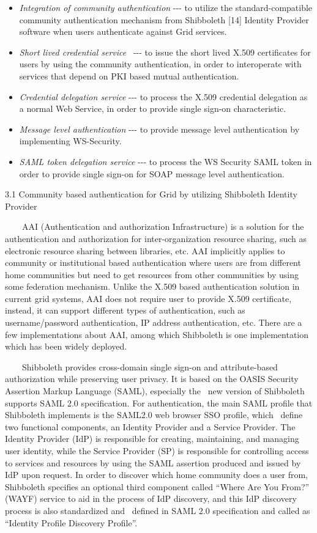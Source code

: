 \documentclass{article}
\newcommand\liststyleLiv{%
\renewcommand\labelitemi{${\bullet}$}
\renewcommand\labelitemii{${\circ}$}
\renewcommand\labelitemiii{${\blacksquare}$}
\renewcommand\labelitemiv{${\bullet}$}
}
\begin{document}
\liststyleLiv
\begin{itemize}
\item \textit{Integration of community authentication} -{}-{}- to
utilize the standard-compatible community authentication mechanism from
Shibboleth [14] Identity Provider software when users authenticate
against Grid services.
\item \textit{Short lived credential service} \ {}-{}-{}- to issue the
short lived X.509 certificates for users by using the community
authentication, in order to interoperate with services that depend on
PKI based mutual authentication.
\item \textit{Credential delegation service} -{}-{}- to process the
X.509 credential delegation as a normal Web Service, in order to
provide single sign-on characteristic.
\item \textit{Message level authentication} -{}-{}- to provide message
level authentication by implementing WS-Security.
\item \textit{SAML token delegation service} -{}-{}- to process the WS
Security SAML token in order to provide single sign-on for SOAP message
level authentication.
\end{itemize}
3.1 Community based authentication for Grid by utilizing Shibboleth
Identity Provider

\ \ \ \ AAI (Authentication and authorization Infrastructure) is a
solution for the authentication and authorization for
inter-organization resource sharing, such as electronic resource
sharing between libraries, etc. AAI implicitly applies to community or
institutional based authentication where users are from different home
communities but need to get resources from other communities by using
some federation mechanism. Unlike the X.509 based authentication
solution in current grid systems, AAI does not require user to provide
X.509 certificate, instead, it can support different types of
authentication, such as username/password authentication, IP address
authentication, etc. There are a few implementations about AAI, among
which Shibboleth is one implementation which has been widely deployed.

\ \ \ \ Shibboleth provides cross-domain single sign-on and
attribute-based authorization while preserving user privacy. It is
based on the OASIS Security Assertion Markup Language (SAML),
especially the \ new version of Shibboleth supports SAML 2.0
specification. For authentication, the main SAML profile that
Shibboleth implements is the SAML2.0 web browser SSO profile, which
\ define two functional components, an Identity Provider and a Service
Provider. The Identity Provider (IdP) is responsible for creating,
maintaining, and managing user identity, while the Service Provider
(SP) is responsible for controlling access to services and resources by
using the SAML assertion produced and issued by IdP upon request. In
order to discover which home community does a user from, Shibboleth
specifies an optional third component called {\textquotedblleft}Where
Are You From?{\textquotedblright} (WAYF) service to aid in the process
of IdP discovery, and this IdP discovery process is also standardized
and \ defined in SAML 2.0 specification and called as
{\textquotedblleft}Identity Profile Discovery
Profile{\textquotedblright}.
\end{document}
